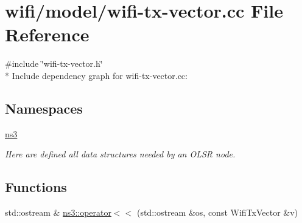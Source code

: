 \hypertarget{wifi-tx-vector_8cc}{}\section{wifi/model/wifi-\/tx-\/vector.cc File Reference}
\label{wifi-tx-vector_8cc}
{\ttfamily \#include \char`\"{}wifi-\/tx-\/vector.\+h\char`\"{}}\\*
Include dependency graph for wifi-\/tx-\/vector.cc\+:
\subsection*{Namespaces}
\begin{DoxyCompactItemize}
\item 
 \hyperlink{namespacens3}{ns3}
\begin{DoxyCompactList}\small\item\em Here are defined all data structures needed by an O\+L\+SR node. \end{DoxyCompactList}\end{DoxyCompactItemize}
\subsection*{Functions}
\begin{DoxyCompactItemize}
\item 
std\+::ostream \& \hyperlink{namespacens3_a3a8fb206e33137628bb0105dac8bbf33}{ns3\+::operator$<$$<$} (std\+::ostream \&os, const Wifi\+Tx\+Vector \&v)
\end{DoxyCompactItemize}
